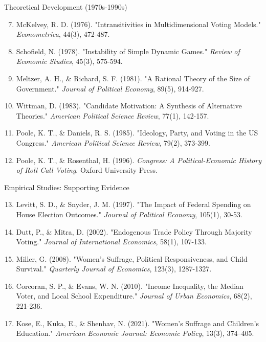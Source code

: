 \documentclass[10pt]{beamer}
\begin{document}
\begin{frame}{Theoretical Development (1970s-1990s)}
\footnotesize
\begin{enumerate}
\setcounter{enumi}{6}
\item McKelvey, R. D. (1976). "Intransitivities in Multidimensional Voting Models." \emph{Econometrica}, 44(3), 472-487.
\item Schofield, N. (1978). "Instability of Simple Dynamic Games." \emph{Review of Economic Studies}, 45(3), 575-594.
\item Meltzer, A. H., \& Richard, S. F. (1981). "A Rational Theory of the Size of Government." \emph{Journal of Political Economy}, 89(5), 914-927.
\item Wittman, D. (1983). "Candidate Motivation: A Synthesis of Alternative Theories." \emph{American Political Science Review}, 77(1), 142-157.
\item Poole, K. T., \& Daniels, R. S. (1985). "Ideology, Party, and Voting in the US Congress." \emph{American Political Science Review}, 79(2), 373-399.
\item Poole, K. T., \& Rosenthal, H. (1996). \emph{Congress: A Political-Economic History of Roll Call Voting}. Oxford University Press.
\end{enumerate}
\end{frame}

\begin{frame}{Empirical Studies: Supporting Evidence}
\footnotesize
\begin{enumerate}
\setcounter{enumi}{12}
\item Levitt, S. D., \& Snyder, J. M. (1997). "The Impact of Federal Spending on House Election Outcomes." \emph{Journal of Political Economy}, 105(1), 30-53.
\item Dutt, P., \& Mitra, D. (2002). "Endogenous Trade Policy Through Majority Voting." \emph{Journal of International Economics}, 58(1), 107-133.
\item Miller, G. (2008). "Women's Suffrage, Political Responsiveness, and Child Survival." \emph{Quarterly Journal of Economics}, 123(3), 1287-1327.
\item Corcoran, S. P., \& Evans, W. N. (2010). "Income Inequality, the Median Voter, and Local School Expenditure." \emph{Journal of Urban Economics}, 68(2), 221-236.
\item Kose, E., Kuka, E., \& Shenhav, N. (2021). "Women's Suffrage and Children's Education." \textit{American Economic Journal: Economic Policy}, 13(3), 374--405.
\end{enumerate}
\end{frame}
\end{document}

